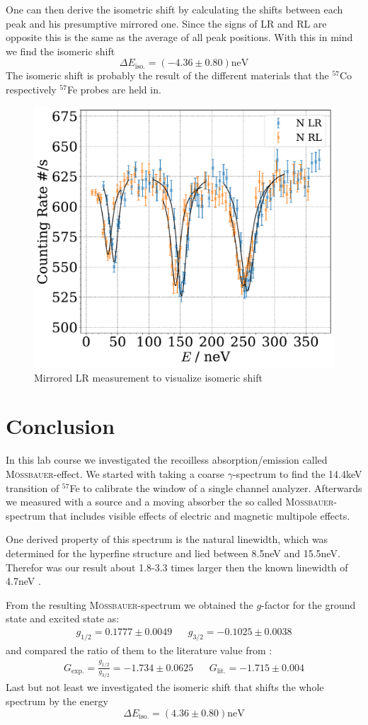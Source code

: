 \documentclass[11pt,a4paper,notitlepage]{scrartcl}
\begin{document}
One can then derive the isometric shift by calculating the shifts between each peak and his presumptive mirrored one. Since the signs of LR and RL are opposite this is the same as the average of all peak positions. With this in mind we find the isomeric shift
$$\Delta E_{\text{iso.}}=(-4.36\pm0.80)\text{neV}$$
The isomeric shift is probably the result of the different materials that the $^{57}$Co respectively $^{57}$Fe probes are held in. 

\begin{figure}[H]%
	\centering
	\includegraphics[width=0.7\linewidth]{figs/moesbauer_mirrored.pdf}
	\caption{Mirrored LR measurement to visualize isomeric shift}\label{fig:asymm}
\end{figure}
\newpage
\section{Conclusion}
In this lab course we investigated the recoilless absorption/emission called \textsc{Mö\ss bauer}-effect. We started with taking a coarse $\gamma$-spectrum to find the 14.4keV transition of $^{57}$Fe to calibrate the window of a single channel analyzer. Afterwards we measured with a source and a moving absorber the so called \textsc{Mö\ss bauer}-spectrum that includes visible effects of electric and magnetic multipole effects.

One derived property of this spectrum is the natural linewidth, which was determined for the hyperfine structure and lied between 8.5neV and 15.5neV. Therefor was our result about 1.8-3.3 times larger then the known linewidth of 4.7neV \cite{schatz}.

From the resulting \textsc{Mö\ss bauer}-spectrum we obtained the $g$-factor for the ground state and excited state as:
\begin{align*}
	g_{1/2}=0.1777 \pm 0.0049 &&g_{3/2}=-0.1025 \pm 0.0038
\end{align*}
and compared the ratio of them to the literature value from \cite{gfactor}:
\begin{align*}
	G_{\text{exp.}}=\frac{g_{1/2}}{g_{3/2}}=-1.734 \pm 0.0625 &&G_{\text{lit.}}=-1.715\pm0.004
\end{align*}
Last but not least we investigated the isomeric shift that shifts the whole spectrum by the energy
$$\Delta E_{\text{iso.}}=(4.36\pm0.80)\text{neV}$$
\end{document}
